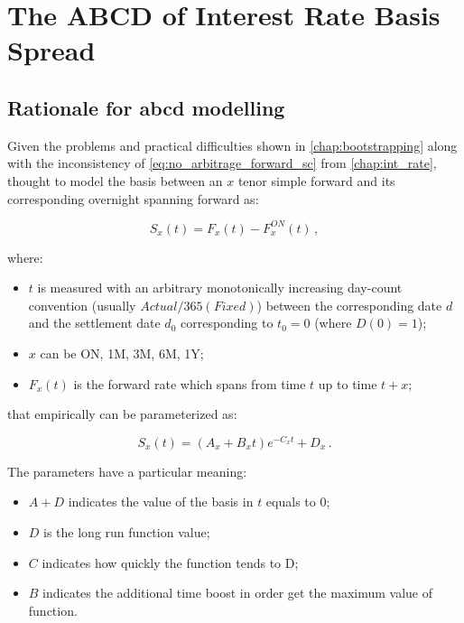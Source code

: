 \chapter{The ABCD of Interest Rate Basis Spread}
\label{chap:abcd}

\section{Rationale for abcd modelling}

Given the problems and practical difficulties shown in \autoref{chap:bootstrapping} along with the inconsistency of \eqref{eq:no_arbitrage_forward_sc} from \autoref{chap:int_rate}, \cite{ametrano_ballabio_mazzocchi} thought to model the basis between an $x$ tenor simple forward and its corresponding overnight spanning forward as:

\begin{equation}
S_x(t) = F_x(t) - F_x^{ON}(t)\,,
\label{eq:S_x}
\end{equation}

where:

\begin{itemize}
    \item $t$ is measured with an arbitrary monotonically increasing day-count convention (usually $Actual/365(Fixed)$) between the corresponding date $d$ and the settlement date $d_0$ corresponding to $t_0=0$ (where $D(0)=1$);
    \item $x$ can be ON, 1M, 3M, 6M, 1Y;
    \item $F_x(t)$ is the forward rate which spans from time $t$ up to time $t+x$;
\end{itemize}

that empirically can be parameterized as:

\begin{equation}
S_x(t) = (A_x + B_x t)e^{-C_x t} + D_x\,.
\label{ABCD}
\end{equation}

The parameters have a particular meaning:
\begin{itemize}
    \item $A + D$ indicates the value of the basis in $t$ equals to 0;
    \item $D$ is the long run function value;
    \item $C$ indicates how quickly the function tends to D;
    \item $B$ indicates the additional time boost in order get the maximum value of function.
\end{itemize}


